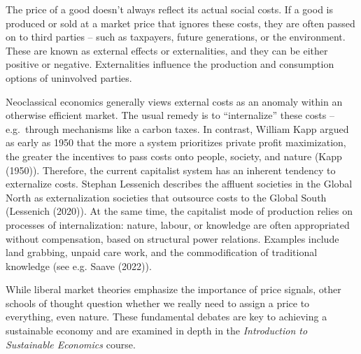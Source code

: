 \documentclass[
  a4paper,
  openany]{book}
\begin{document}
\begin{tcolorbox}[enhanced jigsaw, coltitle=black, bottomtitle=1mm, opacitybacktitle=0.6, titlerule=0mm, opacityback=0, leftrule=.75mm, colbacktitle=quarto-callout-note-color!10!white, bottomrule=.15mm, toptitle=1mm, breakable, title={Internalizing and externalizing}, arc=.35mm, rightrule=.15mm, toprule=.15mm, left=2mm, colback=white, colframe=quarto-callout-note-color-frame]

The price of a good doesn't always reflect its actual social costs. If a
good is produced or sold at a market price that ignores these costs,
they are often passed on to third parties -- such as taxpayers, future
generations, or the environment. These are known as external effects or
externalities, and they can be either positive or negative.
Externalities influence the production and consumption options of
uninvolved parties.

Neoclassical economics generally views external costs as an anomaly
within an otherwise efficient market. The usual remedy is to
``internalize'' these costs -- e.g.~through mechanisms like a carbon
taxes. In contrast, William Kapp argued as early as 1950 that the more a
system prioritizes private profit maximization, the greater the
incentives to pass costs onto people, society, and nature (Kapp (1950)).
Therefore, the current capitalist system has an inherent tendency to
externalize costs. Stephan Lessenich describes the affluent societies in
the Global North as externalization societies that outsource costs to
the Global South (Lessenich (2020)). At the same time, the capitalist
mode of production relies on processes of internalization: nature,
labour, or knowledge are often appropriated without compensation, based
on structural power relations. Examples include land grabbing, unpaid
care work, and the commodification of traditional knowledge (see e.g.
Saave (2022)).

While liberal market theories emphasize the importance of price signals,
other schools of thought question whether we really need to assign a
price to everything, even nature. These fundamental debates are key to
achieving a sustainable economy and are examined in depth in the
\emph{Introduction to Sustainable Economics} course.

\end{tcolorbox}
\end{document}
